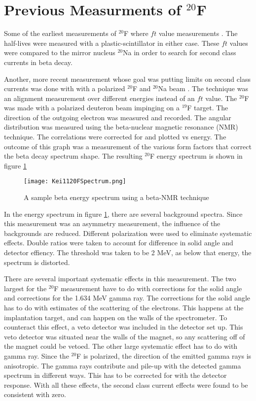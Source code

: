 \documentclass[main.tex]{subfiles}
\begin{document}
\section{Previous Measurments of $^{20}$F}

Some of the earliest measurements of $^{20}$F where $ft$ value measurements \cite{Wil70} \cite{Alb75}.
The half-lives were measured with a plastic-scintillator in either case.  
These $ft$ values were compared to the mirror nucleus $^{20}$Na in order to search for second class currents in beta decay. 

Another, more recent measurement whose goal was putting limits on second class currents was done with with a polarized $^{20}$F and $^{20}$Na beam \cite{Min11}.
The technique was an alignment measurement over different energies instead of an $ft$ value. 
The $^{20}$F was made with a polarized deuteron beam impinging on a $^{19}$F target. 
The direction of the outgoing electron was measured and recorded.
The angular distribution was measured using the beta-nuclear magnetic resonance (NMR) technique.
The correlations were corrected for and plotted vs energy.
The outcome of this graph was a measurement of the various form factors that correct the beta decay spectrum shape. 
The resulting $^{20}$F energy spectrum is shown in figure \ref{fig:keispec}

\begin{figure}[!htb]
	\centerline{\texttt{[image: Kei1120FSpectrum.png]}}
	\caption{A sample beta energy spectrum using a beta-NMR technique \cite{Min11}}
	\label{fig:keispec}
\end{figure}

In the energy spectrum in figure \ref{fig:keispec}, there are several background spectra. 
Since this measurement  was an asymmetry measurement, the influence of the backgrounds are reduced. 
Different polarization were used to eliminate systematic effects.
Double ratios were taken to account for difference in solid angle and detector effiency.
The threshold was taken to be 2 MeV, as below that energy, the spectrum is distorted.

There are several important systematic effects in this measurement.
The two largest for the $^{20}$F measurement have to do with corrections for the solid angle and corrections for the 1.634 MeV gamma ray.
The corrections for the solid angle has to do with estimates of the scattering of the electrons.
This happens at the implantation target, and can happen on the walls of the spectrometer.
To counteract this effect, a veto detector was included in the detector set up. 
This veto detector was situated near the walls of the magnet, so any scattering off of the magnet could be vetoed. 
The other large systematic effect has to do with gamma ray.
Since the $^{20}$F is polarized, the direction of the emitted gamma rays is anisotropic.
The gamma rays contribute and pile-up with the detected gamma spectrum in different ways.
This has to be corrected for with the detector response.
With all these effects, the second class current effects were found to be consistent with zero.   
\end{document}
